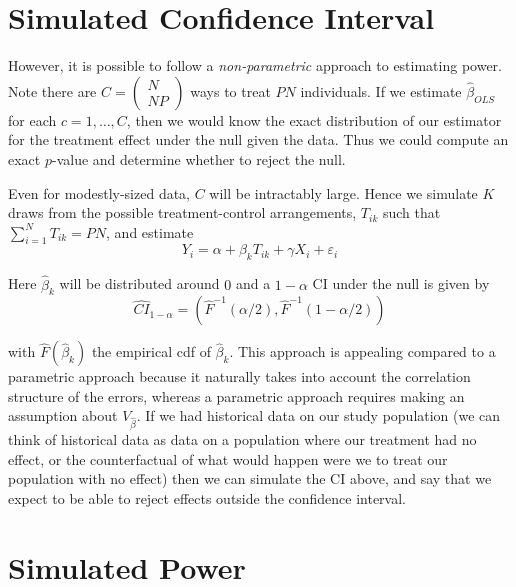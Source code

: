 \documentclass{article}
\begin{document}
\section{Simulated Confidence Interval}
\label{sec:simulated_confidence_interval}

However, it is possible to follow a \textit{non-parametric} approach to estimating power. Note there are $C = \left(\begin{smallmatrix} N \\ NP \end{smallmatrix}\right)$ ways to treat $PN$ individuals. If we estimate $\widehat{\beta}_{OLS}$ for each $c = 1, \ldots, C$, then we would know the exact distribution of our estimator for the treatment effect under the null given the data. Thus we could compute an exact $p$-value and determine whether to reject the null.

Even for modestly-sized data, $C$ will be intractably large. Hence we simulate $K$ draws from the possible treatment-control arrangements, $T_{ik}$ such that $\sum^{N}_{i = 1} T_{ik} = PN$, and estimate
\begin{equation}
Y_i = \alpha + \beta_k T_{ik} + \gamma X_i + \varepsilon_i
\label{eq:ri_ci_reg}
\end{equation}

Here $\widehat{\beta}_k$ will be distributed around $0$ and a $1 - \alpha$ CI under the null is given by
\begin{equation}
\widehat{CI}_{1 - \alpha} = \left(\widehat{F}^{-1}(\alpha / 2), \widehat{F}^{-1}(1 - \alpha / 2)\right)
\label{eq:ri_ci_hat}
\end{equation}

with $\widehat{F}(\widehat{\beta}_k)$ the empirical cdf of $\widehat{\beta}_k$. This approach is appealing compared to a parametric approach because it naturally takes into account the correlation structure of the errors, whereas a parametric approach requires making an assumption about $V_{\widehat{\beta}}$. If we had historical data on our study population (we can think of historical data as data on a population where our treatment had no effect, or the counterfactual of what would happen were we to treat our population with no effect) then we can simulate the CI above, and say that we expect to be able to reject effects outside the confidence interval.

\section{Simulated Power}
\label{sec:simulated_power}
\end{document}

